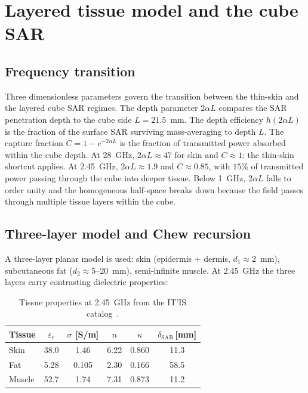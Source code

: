 \documentclass[journal,twocolumn,10pt]{IEEEtran}
\theoremstyle{plain}
\theoremstyle{remark}
\begin{document}
\section{Layered tissue model and the cube SAR}\label{si:layered}

\subsection{Frequency transition}
Three dimensionless parameters govern the transition between the
thin-skin and the layered cube SAR regimes. The depth parameter
$2\alpha L$ compares the SAR penetration depth to the cube side
$L = 21.5$~mm. The depth efficiency $h(2\alpha L)$ is the fraction
of the surface SAR surviving mass-averaging to depth $L$. The
capture fraction $C = 1 - e^{-2\alpha L}$ is the fraction of
transmitted power absorbed within the cube depth.
At 28~GHz, $2\alpha L \approx 47$ for skin and $C \approx 1$: the
thin-skin shortcut applies. At 2.45~GHz, $2\alpha L \approx 1.9$
and $C \approx 0.85$, with $15\%$ of transmitted power passing
through the cube into deeper tissue. Below 1~GHz, $2\alpha L$
falls to order unity and the homogeneous half-space breaks down
because the field passes through multiple tissue layers within the cube.

\subsection{Three-layer model and Chew recursion}
A three-layer planar model is used:
skin (epidermis + dermis, $d_1 \approx 2$~mm), subcutaneous fat
($d_2 \approx 5$--20~mm), semi-infinite muscle. At 2.45~GHz
the three layers carry contrasting dielectric properties:

\begin{table}[!t]
\centering
\caption{Tissue properties at 2.45~GHz from the IT'IS
catalog~\cite{ITISv5,Gabriel1996}.}
\label{tab:layers-2g45}
\begin{tabular}{lccccc}
\toprule
Tissue & $\varepsilon_r$ & $\sigma$ [S/m] & $n$ & $\kappa$
  & $\delta_{\mathrm{SAR}}$\,[mm] \\
\midrule
Skin   & 38.0 & 1.46  & 6.22 & 0.860 & 11.3 \\
Fat    &  5.28 & 0.105 & 2.30 & 0.166 & 58.5 \\
Muscle & 52.7 & 1.74  & 7.31 & 0.873 & 11.2 \\
\bottomrule
\end{tabular}
\end{table}
\end{document}
